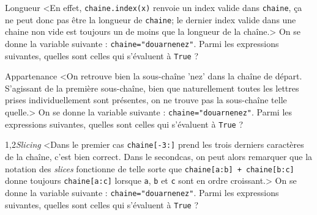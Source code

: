 \begin{quiz}[title={Séquences}]
\small

\begin{quizquestion}[b]{2}{1}{Longueur}
<En effet, \texttt{chaine.index(x)} renvoie un index valide dans \texttt{chaine}, ça ne peut donc pas être la longueur de \texttt{chaine}; le dernier index valide dans une chaine non vide est toujours un de moins que la longueur de la chaîne.> 
On se donne la variable suivante : \texttt{chaine="douarnenez"}. Parmi les expressions suivantes, quelles sont celles qui s'évaluent à \texttt{True} ?
\end{quizquestion}

\begin{quizquestion}[b]{2}{1}{Appartenance}
<On retrouve bien la sous-chaîne 'nez' dans la chaîne de départ.
S'agissant de la première sous-chaîne, bien que naturellement toutes les lettres prises individuellement sont présentes, on ne trouve pas la sous-chaîne telle quelle.> 
On se donne la variable suivante : \texttt{chaine="douarnenez"}. Parmi les expressions suivantes, quelles sont celles qui s'évaluent à \texttt{True} ?
\end{quizquestion}

\begin{quizquestion}[b]{1,2}{}{{\itshape Slicing}}
<Dans le premier cas \texttt{chaine[-3:]} prend les trois derniers caractères de la chaî\-ne, c'est bien correct.
Dans le second\linebreak cas, on peut alors remarquer que la notation des \textit{slices} fonctionne de telle sorte que \texttt{chaine[a:b] + chaine[b:c]} donne toujours \texttt{chaine[a:c]} lorsque \texttt{a}, \texttt{b} et \texttt{c} sont en ordre croissant.> 
On se donne la variable suivante : \texttt{chaine="douarnenez"}. Parmi les expressions suivantes, quelles sont celles qui s'évaluent à \texttt{True} ?
\end{quizquestion}
\end{quiz}

